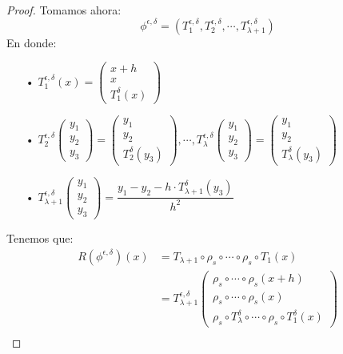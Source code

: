 \documentclass[12pt,a4paper]{book}
\begin{document}
\begin{proof}
Tomamos ahora:
$$\phi^{\epsilon,\delta}=(T_{1}^{\epsilon,\delta},T_{2}^{\epsilon,\delta},\cdots,T_{\lambda+1}^{\epsilon,\delta})$$
En donde:
\begin{enumerate}
\item[•] $T_{1}^{\epsilon,\delta}(x)=\left(\begin{matrix}
x+h \\ x \\ T_{1}^{\delta}(x)
\end{matrix}\right)$
\item[•] $T_{2}^{\epsilon,\delta}\left(\begin{matrix}
y_{1} \\ y_{2} \\ y_{3}
\end{matrix}\right)=\left(\begin{matrix}
y_{1} \\ y_{2} \\ T_{2}^{\delta}(y_{3})
\end{matrix}\right),\cdots,T_{\lambda}^{\epsilon,\delta}\left(\begin{matrix}
y_{1} \\ y_{2} \\ y_{3}
\end{matrix}\right)=\left(\begin{matrix}
y_{1} \\ y_{2} \\ T_{\lambda}^{\delta}(y_{3})
\end{matrix}\right)$
\item[•] $T_{\lambda +1}^{\epsilon,\delta}\left(\begin{matrix}
y_{1} \\ y_{2} \\ y_{3}
\end{matrix}\right)=\dfrac{y_{1}-y_{2}-h\cdot T_{\lambda +1}^{\delta}(y_{3})}{h^{2}}$
\end{enumerate}
\smallskip
Tenemos que:
\begin{equation*}
\begin{split}
R(\phi^{\epsilon,\delta})(x)&=T_{\lambda +1}\circ\rho_{s}\circ\cdots\circ\rho_{s}\circ T_{1}(x)\\&
=T_{\lambda +1}^{\epsilon,\delta}\left(\begin{matrix}
\rho_{s}\circ\cdots\circ\rho_{s} (x+h) \\
\rho_{s}\circ\cdots\circ\rho_{s} (x) \\
\rho_{s}\circ T_{\lambda}^{\delta}\circ\cdots\circ\rho_{s}\circ T_{1}^{\delta}(x)
\end{matrix}\right)\\&

\end{split}
\end{equation*}
\end{proof}
\end{document}
